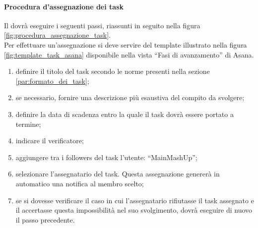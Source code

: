 			\paragraph{Procedura d'assegnazione dei task}
			\label{par:procedura_assegnazione_task}
			Il \roleProjectManager{} dovrà eseguire i seguenti passi, riassunti in seguito nella figura \ref{fig:procedura_assegnazione_task}. \\
			Per effettuare un'assegnazione si deve servire del template illustrato nella figura \ref{fig:template_task_asana} disponibile nella vista ``Fasi di avanzamento'' di Asana.
				\begin{enumerate}
					\item definire il titolo del task secondo le norme presenti nella sezione \ref{par:formato_dei_task};
					\item se necessario, fornire una descrizione più esaustiva del compito da svolgere;
					\item definire la data di scadenza entro la quale il task\gloss{} dovrà essere portato a termine;
					\item indicare il verificatore;
					\item aggiungere tra i followers del task\gloss{} l'utente: ``MainMashUp'';
					\item selezionare l'assegnatario del task\gloss{}. Questa assegnazione genererà in automatico una notifica al membro scelto;
					\item se si dovesse verificare il caso in cui l'assegnatario rifiutasse il task\gloss{} assegnato e il \roleProjectManager{} accertasse questa impossibilità nel suo svolgimento, dovrà eseguire di nuovo il passo precedente. 
				\end{enumerate}
